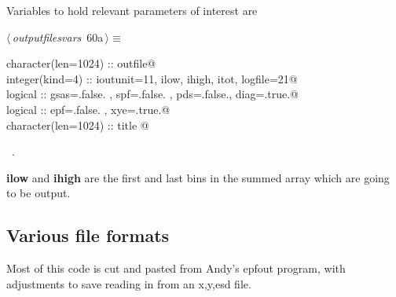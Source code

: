 \documentclass[10pt,a4paper,notitlepage]{article}
\newcommand{\var}[1]{\textbf{\textsf{#1}}} %
\begin{document}
Variables to hold relevant parameters of interest are
\begin{flushleft} \small
\begin{minipage}{\linewidth}\label{scrap64}\raggedright\small
{} $\langle\,${\it outputfilesvars}\nobreak\ {\footnotesize {60a}}$\,\rangle\equiv$
\vspace{-1ex}
\begin{list}{}{} \item
\mbox{}\verb@       character(len=1024) :: outfile@\\
\mbox{}\verb@      integer(kind=4) :: ioutunit=11, ilow, ihigh, itot, logfile=21@\\
\mbox{}\verb@      logical :: gsas=.false. , spf=.false. , pds=.false., diag=.true.@\\
\mbox{}\verb@      logical :: epf=.false. , xye=.true.@\\
\mbox{}\verb@      character(len=1024) :: title                                           @{\NWsep}
\end{list}
\vspace{-1.5ex}
\footnotesize
\begin{list}{}{\setlength{\itemsep}{-\parsep}\setlength{\itemindent}{-\leftmargin}}
\item \NWtxtMacroRefIn\ .

\item{}
\end{list}
\end{minipage}\vspace{4ex}
\end{flushleft}
\var{ilow} and \var{ihigh} are the first and last bins in the summed
array which are going to be output.

\subsection{Various file formats}

Most of this code is cut and pasted from Andy's epfout program, with 
adjustments to save reading in from an x,y,esd file.
\end{document}
